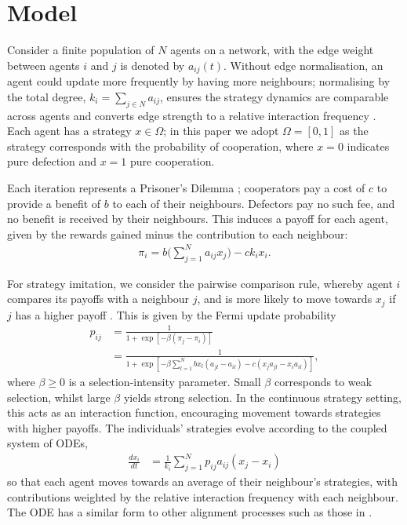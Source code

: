 \documentclass[10pt]{article}
\begin{document}
\section{Model}\label{Section: model}
Consider a finite population of $N$ agents on a network, with the edge weight between agents $i$ and $j$ is denoted by $a_{ij}(t)$.  Without edge normalisation, an agent could update more frequently by having more neighbours; normalising by the total degree, $k_i = \sum_{j\in N}a_{ij}$, ensures the strategy dynamics are comparable across agents and converts edge strength to a relative interaction frequency \cite{nugent2024bridging}. Each agent has a strategy $x \in \Omega$; in this paper we adopt $\Omega =[0,1]$ as the strategy corresponds with the probability of cooperation, where $x=0$ indicates pure defection and $x=1$ pure cooperation. 

Each iteration represents a Prisoner's Dilemma \cite{nowak_five_2006}; cooperators pay a cost of $c$ to provide a benefit of $b$ to each of their neighbours. Defectors pay no such fee, and no benefit is received by their neighbours. This induces a payoff for each agent, given by the rewards gained minus the contribution to each neighbour:
\begin{align*}
    \pi_i = b\bigg(\sum_{j=1}^Na_{ij} x_j \bigg) - c k_ix_i.
\end{align*}

For strategy imitation, we consider the pairwise comparison rule, whereby agent $i$ compares its payoffs with a neighbour $j$, and is more likely to move towards $x_j$ if $j$ has a higher payoff \cite{pinheiro_linking_2016}. This is given by the Fermi update probability
\begin{align*}
    p_{ij} &= \frac{1}{1+\exp[-\beta(\pi_j-\pi_i)]}\\
    &= \frac{1}{1+\exp[-\beta \sum_{l=1}^Nbx_l(a_{jl}-a_{il}) -c(x_ja_{jl}-x_ia_{il})]},
\end{align*}
where $\beta\geq0$ is a selection-intensity parameter. Small $\beta$ corresponds to weak selection, whilst large $\beta$ yields strong selection. In the continuous strategy setting, this acts as an interaction function, encouraging movement towards strategies with higher payoffs. The individuals' strategies evolve according to the coupled system of ODEs,
\begin{align}\label{eqn: strategy ode standard speed}
    \frac{dx_i}{dt} &= \frac{1}{k_i}\sum_{j=1}^N p_{ij}a_{ij}(x_j-x_i)
\end{align}
so that each agent moves towards an average of their neighbour's strategies, with contributions weighted by the relative interaction frequency with each neighbour. The ODE has a similar form to other alignment processes such as those in \cite{motsch2014heterophilious, nugent2024bridging, brooks2024emergence, couzin2002collective}.
\end{document}
